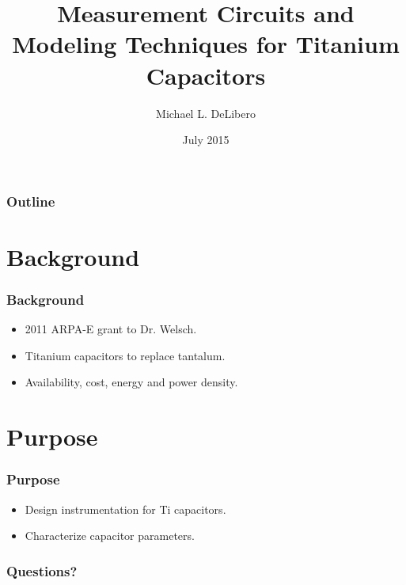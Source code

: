 \documentclass{beamer}
\title{Measurement Circuits and Modeling Techniques for Titanium Capacitors}
\author{Michael L. DeLibero}
\date{July 2015}
\institute[CWRU]{Case Western Reserve University}
\begin{document}
\begin{frame}
    \titlepage
\end{frame}



\begin{frame}
  \frametitle{Outline}
  \tableofcontents[pausesections]
\end{frame}

\section{Background}
\begin{frame}
    \frametitle{Background}
    \begin{itemize}
        \item 2011 ARPA-E grant to Dr. Welsch.
        \item Titanium capacitors to replace tantalum.
        \item Availability, cost, energy and power density.
    \end{itemize}
\end{frame}

\section{Purpose}
\begin{frame}
    \frametitle{Purpose}
    \begin{itemize}
        \item Design instrumentation for Ti capacitors.
        \item Characterize capacitor parameters.
    \end{itemize}
\end{frame}








\begin{frame}
    \frametitle{Questions?}
\end{frame}
\end{document}
